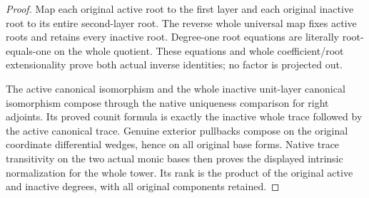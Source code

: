\begin{proof}
Map each original active root to the first layer and each original
inactive root to its entire second-layer root.  The reverse whole
universal map fixes active roots and retains every inactive root.
Degree-one root equations are literally root-equals-one on the whole
quotient.  These equations and whole coefficient/root extensionality
prove both actual inverse identities; no factor is projected out.

The active canonical isomorphism and the whole inactive unit-layer
canonical isomorphism compose through the native uniqueness comparison
for right adjoints.  Its proved counit formula is exactly the inactive
whole trace followed by the active canonical trace.  Genuine exterior
pullbacks compose on the original coordinate differential wedges, hence
on all original base forms.  Native trace transitivity on the two actual
monic bases then proves the displayed intrinsic normalization for the
whole tower.  Its rank is the product of the original active and inactive
degrees, with all original components retained.
\end{proof}

